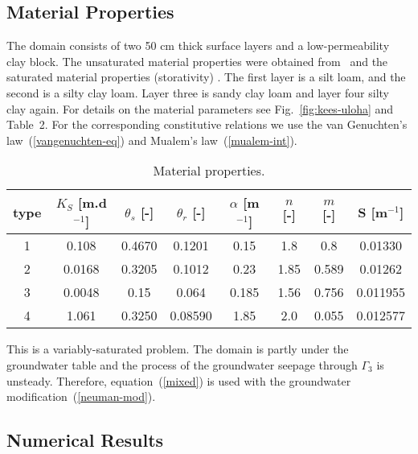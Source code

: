 \documentclass[final,3p,times,twocolumn]{elsarticle}
\begin{document}
\subsection{Material Properties}

The domain consists of two 50 cm thick surface layers and a low-permeability
clay block. The unsaturated material properties were obtained from~\cite{unsat-prop} 
and the saturated material properties (storativity) \cite{pech}. 
The first layer is a silt loam, and the second is a silty clay 
loam. Layer three is sandy clay loam and layer four silty clay again. 
For details on the material parameters see Fig.~\ref{fig:kees-uloha} 
and Table~2. For the corresponding constitutive 
relations we use the van Genuchten's law~(\ref{vangenuchten-eq}) and Mualem's 
law~(\ref{mualem-int}).

\begin{table*}[!ht]
\begin{center}
\caption{Material properties.}
\begin{small}
% 
% 
\begin{tabular}{|c|c|c|c|c|c|c|c|} \hline
type & $K_S$ [m.d${}^{-1}$] & $\theta_s$ [-] & $\theta_r$ [-] & $\alpha$ [m${}^{-1}$] & $n$ [-] & $m$ [-] & S [m${}^{-1}$] \\ \hline \hline
1 & 0.108 & 0.4670 & 0.1201 &0.15 &1.8 & 0.8 & 0.01330 \\\hline
2 & 0.0168 & 0.3205 & 0.1012 & 0.23 & 1.85 & 0.589 & 0.01262  \\\hline
3 & 0.0048 & 0.15 & 0.064 & 0.185 & 1.56 & 0.756 & 0.011955 \\\hline
4 & 1.061 & 0.3250 & 0.08590 & 1.85 & 2.0 & 0.055 & 0.012577  \\\hline
\end{tabular}
\end{small}
\end{center} 
\label{table:2}
\end{table*} 


This is a variably-saturated problem. The domain is partly under the groundwater 
table and the process of the groundwater seepage through $\Gamma_3$ is 
unsteady. Therefore, equation~(\ref{mixed}) is used with the groundwater 
modification~(\ref{neuman-mod}).

\subsection{Numerical Results}
\end{document}
